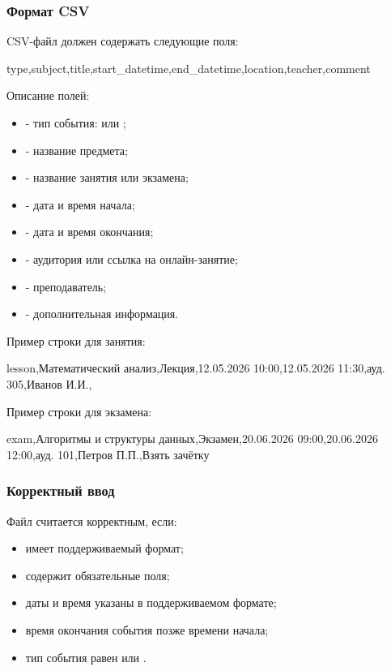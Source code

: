 \documentclass[10pt,a4paper,final]{article} %
\begin{document}
\subsubsection{Формат CSV}

CSV-файл должен содержать следующие поля:

\begin{Code}
type,subject,title,start_datetime,end_datetime,location,teacher,comment
\end{Code}

Описание полей:

\begin{itemize}
    \item {} - тип события:  или ;
    \item {} - название предмета;
    \item {} - название занятия или экзамена;
    \item {} - дата и время начала;
    \item {} - дата и время окончания;
    \item {} - аудитория или ссылка на онлайн-занятие;
    \item {} - преподаватель;
    \item {} - дополнительная информация.
\end{itemize}

Пример строки для занятия:

\begin{Code}
lesson,Математический анализ,Лекция,12.05.2026 10:00,12.05.2026 11:30,ауд. 305,Иванов И.И.,
\end{Code}

Пример строки для экзамена:

\begin{Code}
exam,Алгоритмы и структуры данных,Экзамен,20.06.2026 09:00,20.06.2026 12:00,ауд. 101,Петров П.П.,Взять зачётку
\end{Code}

\subsubsection{Корректный ввод}

Файл считается корректным, если:

\begin{itemize}
    \item имеет поддерживаемый формат;
    \item содержит обязательные поля;
    \item даты и время указаны в поддерживаемом формате;
    \item время окончания события позже времени начала;
    \item тип события равен  или .
\end{itemize}
\end{document}
